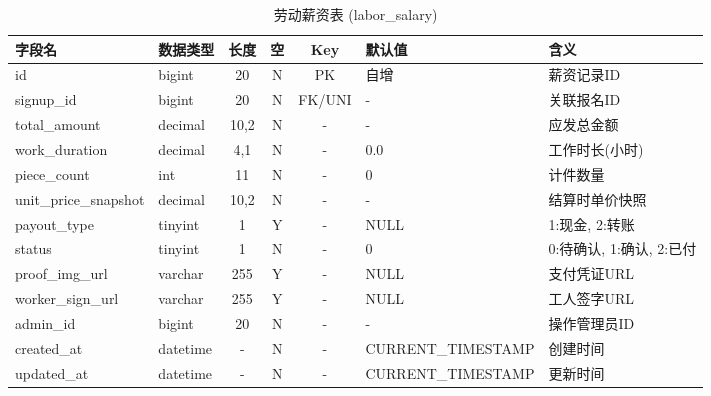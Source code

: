 \documentclass[UTF8,a4paper,12pt]{article}
\begin{document}
\begin{table}[H]
    \centering
    \caption{劳动薪资表 (labor\_salary)}
    \label{tab:labor_salary}
    \small
    \renewcommand{\arraystretch}{1.3}
    \begin{tabular}{|l|l|c|c|c|l|l|}
        \hline
        \rowcolor{gray!15} \textbf{字段名} & \textbf{数据类型} & \textbf{长度} & \textbf{空} & \textbf{Key} & \textbf{默认值} & \textbf{含义} \\ \hline
        id & bigint & 20 & N & PK & 自增 & 薪资记录ID \\ \hline
        signup\_id & bigint & 20 & N & FK/UNI & - & 关联报名ID \\ \hline
        total\_amount & decimal & 10,2 & N & - & - & 应发总金额 \\ \hline
        work\_duration & decimal & 4,1 & N & - & 0.0 & 工作时长(小时) \\ \hline
        piece\_count & int & 11 & N & - & 0 & 计件数量 \\ \hline
        unit\_price\_snapshot & decimal & 10,2 & N & - & - & 结算时单价快照 \\ \hline
        payout\_type & tinyint & 1 & Y & - & NULL & 1:现金, 2:转账 \\ \hline
        status & tinyint & 1 & N & - & 0 & 0:待确认, 1:确认, 2:已付 \\ \hline
        proof\_img\_url & varchar & 255 & Y & - & NULL & 支付凭证URL \\ \hline
        worker\_sign\_url & varchar & 255 & Y & - & NULL & 工人签字URL \\ \hline
        admin\_id & bigint & 20 & N & - & - & 操作管理员ID \\ \hline
        created\_at & datetime & - & N & - & CURRENT\_TIMESTAMP & 创建时间 \\ \hline
        updated\_at & datetime & - & N & - & CURRENT\_TIMESTAMP & 更新时间 \\ \hline
    \end{tabular}
\end{table}
\end{document}
